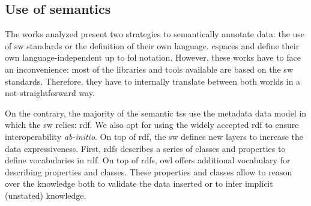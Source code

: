 \subsection{Use of semantics}

The works analyzed present two strategies to semantically annotate data: the use of \ac{sw} standards or the definition of their own language.
\ac{cspaces} \citep{martinrecuerda_towards_2005} and \citet{nardini_semantic_2013} define their own language-independent up to \ac{fol} notation.
However, these works have to face an inconvenience: most of the libraries and tools available are based on the \ac{sw} standards. %
Therefore, they have to internally translate between both worlds in a not-straightforward way. %




On the contrary, the majority of the semantic \acp{ts} use the metadata data model in which the \ac{sw} relies: \ac{rdf}. %
We also opt for using the widely accepted \ac{rdf} to ensure interoperability \emph{ab-initio}.
On top of \ac{rdf}, the \ac{sw} defines new layers to increase the data expressiveness.
First, \ac{rdfs}  describes a series of classes and properties to define vocabularies in \ac{rdf}.
On top of \ac{rdfs}, \ac{owl} offers additional vocabulary for describing properties and classes.
These properties and classes allow to reason over the knowledge both to validate the data inserted or to infer implicit (unstated) knowledge. %



